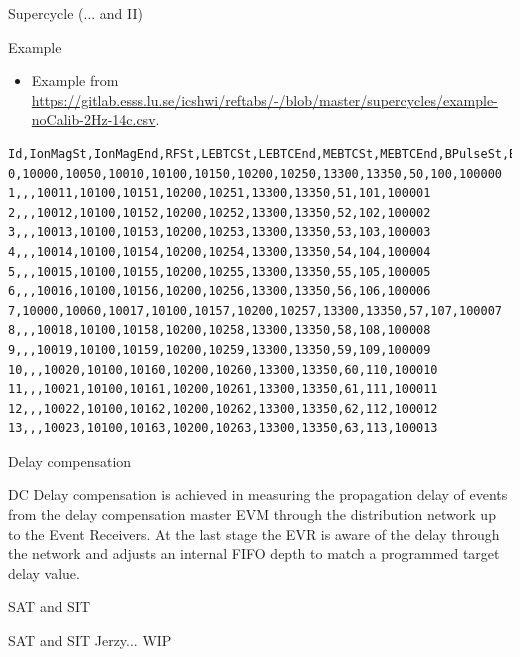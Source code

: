 \documentclass[
  9pt
  , table
  , ignorenonframetext
]{beamer}
\begin{document}
\begin{frame}{Supercycle (... and II)}
  \begin{block}{Example}
    \begin{itemize}
      \item Example from \url{https://gitlab.esss.lu.se/icshwi/reftabs/-/blob/master/supercycles/example-noCalib-2Hz-14c.csv}.
    \end{itemize}
    \begin{lstlisting}[style=termstyle,breaklines=true,basicstyle=\scriptsize]
Id,IonMagSt,IonMagEnd,RFSt,LEBTCSt,LEBTCEnd,MEBTCSt,MEBTCEnd,BPulseSt,BPulseEnd,BLen,BEn,BCurr
0,10000,10050,10010,10100,10150,10200,10250,13300,13350,50,100,100000
1,,,10011,10100,10151,10200,10251,13300,13350,51,101,100001
2,,,10012,10100,10152,10200,10252,13300,13350,52,102,100002
3,,,10013,10100,10153,10200,10253,13300,13350,53,103,100003
4,,,10014,10100,10154,10200,10254,13300,13350,54,104,100004
5,,,10015,10100,10155,10200,10255,13300,13350,55,105,100005
6,,,10016,10100,10156,10200,10256,13300,13350,56,106,100006
7,10000,10060,10017,10100,10157,10200,10257,13300,13350,57,107,100007
8,,,10018,10100,10158,10200,10258,13300,13350,58,108,100008
9,,,10019,10100,10159,10200,10259,13300,13350,59,109,100009
10,,,10020,10100,10160,10200,10260,13300,13350,60,110,100010
11,,,10021,10100,10161,10200,10261,13300,13350,61,111,100011
12,,,10022,10100,10162,10200,10262,13300,13350,62,112,100012
13,,,10023,10100,10163,10200,10263,13300,13350,63,113,100013
    \end{lstlisting}
  \end{block}
\end{frame}

\begin{frame}{Delay compensation}
  \begin{block}{DC}
    Delay compensation is achieved in measuring the propagation delay of events from the delay compensation master EVM through the distribution network up to the Event Receivers. At the last stage the EVR is aware of the delay through the network and adjusts an internal FIFO depth to match a programmed target delay value.
  \end{block}
\end{frame}

\begin{frame}{SAT and SIT}
  \begin{block}{SAT and SIT}
    Jerzy... WIP
  \end{block}
\end{frame}
\end{document}
